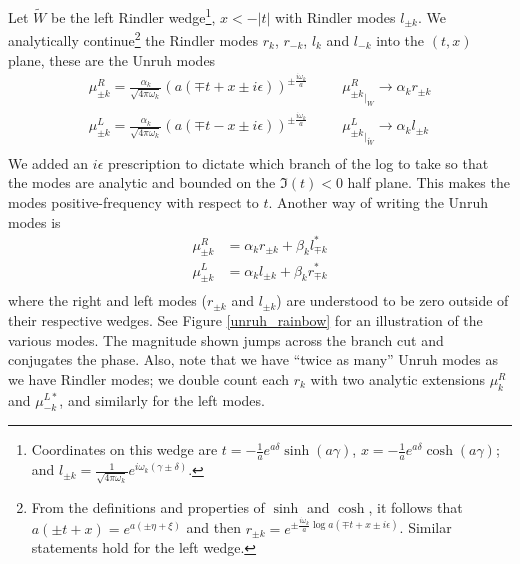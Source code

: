 \documentclass[12pt,a4paper]{article}
\begin{document}
Let $\widetilde{W}$ be the left Rindler wedge\footnote{Coordinates on this wedge are $t = -\frac{1}{a}e^{a\delta} \sinh(a\gamma)$, $x = -\frac{1}{a}e^{a\delta} \cosh(a\gamma)$; and $l_{\pm k} = \frac{1}{\sqrt{4 \pi \omega_k}} e^{i\omega_k(\gamma \pm \delta)}$.}, $x < -|t|$ with Rindler modes $l_{\pm k}$.  We analytically continue\footnote{From the definitions and properties of $\sinh$ and $\cosh$, it follows that $a(\pm t + x) = e^{a(\pm \eta + \xi)}$ and then $r_{\pm k} = e^{\pm \frac{i \omega_k}{a}\log a(\mp t + x \pm i\epsilon)}$.  Similar statements hold for the left wedge.} the Rindler modes $r_k$, $r_{-k}$, $l_k$ and $l_{-k}$ into the $(t,x)$ plane, these are the Unruh modes
\begin{equation}
  \begin{array}{ll}
    \mu^R_{\pm k} = \frac{\alpha_k }{\sqrt{4 \pi \omega_k}} (a(\mp t + x \pm  i \epsilon))^{\pm \frac{i \omega_k}{a}} & \hspace{20pt}
       {\mu^R_{\pm k}}_{|_W} \rightarrow \alpha_k r_{\pm k} \\
    \mu^L_{\pm k} =  \frac{\alpha_k}{\sqrt{4 \pi \omega_k}} (a(\mp t - x \pm  i \epsilon))^{\pm \frac{i \omega_k}{a}} & \hspace{20pt}
    {\mu^L_{\pm k}}_{|_{\widetilde{W}}} \rightarrow \alpha_k l_{\pm k} \\
  \end{array}
\end{equation}
We added an $i \epsilon$ prescription to dictate which branch of the log to take so that the modes are analytic and bounded on the $\mathfrak{I}(t) < 0$ half plane.  This makes the modes positive-frequency with respect to $t$.  Another way of writing the Unruh modes is
\begin{equation}
\begin{aligned}
  \mu^R_{\pm k} &= \alpha_k r_{\pm k} + \beta_k l^*_{\mp k} \\
  \mu^L_{\pm k} &= \alpha_k l_{\pm k} + \beta_k r^*_{\mp k} \\
\end{aligned}
\label{unruh_mode_def}
\end{equation}
where the right and left modes ($r_{\pm k}$ and $l_{\pm k}$) are understood to be zero outside of their respective wedges. See Figure \ref{unruh_rainbow} for an illustration of the various modes. The magnitude shown jumps across the branch cut and conjugates the phase.  Also, note that we have ``twice as many'' Unruh modes as we have Rindler modes; we double count each $r_k$ with two analytic extensions $\mu^R_k$ and $\mu^{L*}_{-k}$, and similarly for the left modes.
\end{document}
